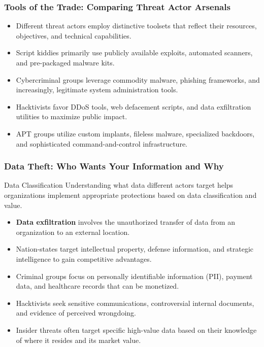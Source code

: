 \documentclass{beamer}
\begin{document}
\begin{frame}
    \frametitle{Tools of the Trade: Comparing Threat Actor Arsenals}
    
    \begin{itemize}
        \item Different threat actors employ distinctive toolsets that reflect their resources, objectives, and technical capabilities.
        \item Script kiddies primarily use publicly available exploits, automated scanners, and pre-packaged malware kits.
        \item Cybercriminal groups leverage commodity malware, phishing frameworks, and increasingly, legitimate system administration tools.
        \item Hacktivists favor DDoS tools, web defacement scripts, and data exfiltration utilities to maximize public impact.
        \item APT groups utilize custom implants, fileless malware, specialized backdoors, and sophisticated command-and-control infrastructure.
    \end{itemize}
\end{frame}

\begin{frame}
    \frametitle{Data Theft: Who Wants Your Information and Why}
    
    \begin{alertblock}{Data Classification}
        Understanding what data different actors target helps organizations implement appropriate protections based on data classification and value.
    \end{alertblock}
    
    \begin{itemize}
        \item \textbf{Data exfiltration} involves the unauthorized transfer of data from an organization to an external location.
        \item Nation-states target intellectual property, defense information, and strategic intelligence to gain competitive advantages.
        \item Criminal groups focus on personally identifiable information (PII), payment data, and healthcare records that can be monetized.
        \item Hacktivists seek sensitive communications, controversial internal documents, and evidence of perceived wrongdoing.
        \item Insider threats often target specific high-value data based on their knowledge of where it resides and its market value.
    \end{itemize}
\end{frame}
\end{document}
